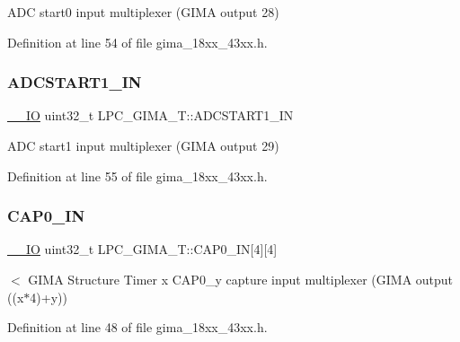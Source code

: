 A\+DC start0 input multiplexer (G\+I\+MA output 28) 

Definition at line 54 of file gima\+\_\+18xx\+\_\+43xx.\+h.

\mbox{\label{struct_l_p_c___g_i_m_a___t_ac21005da6bebbc5e17ff4bc950eb8784}} 
\subsubsection{\texorpdfstring{A\+D\+C\+S\+T\+A\+R\+T1\+\_\+\+IN}{ADCSTART1\_IN}}
{\footnotesize\ttfamily \hyperlink{core__sc300_8h_aec43007d9998a0a0e01faede4133d6be}{\+\_\+\+\_\+\+IO} uint32\+\_\+t L\+P\+C\+\_\+\+G\+I\+M\+A\+\_\+\+T\+::\+A\+D\+C\+S\+T\+A\+R\+T1\+\_\+\+IN}

A\+DC start1 input multiplexer (G\+I\+MA output 29) 

Definition at line 55 of file gima\+\_\+18xx\+\_\+43xx.\+h.

\mbox{\label{struct_l_p_c___g_i_m_a___t_a3f073838210e08cff5480aaeac1a3ccd}} 
\subsubsection{\texorpdfstring{C\+A\+P0\+\_\+\+IN}{CAP0\_IN}}
{\footnotesize\ttfamily \hyperlink{core__sc300_8h_aec43007d9998a0a0e01faede4133d6be}{\+\_\+\+\_\+\+IO} uint32\+\_\+t L\+P\+C\+\_\+\+G\+I\+M\+A\+\_\+\+T\+::\+C\+A\+P0\+\_\+\+IN\mbox{[}4\mbox{]}\mbox{[}4\mbox{]}}

$<$ G\+I\+MA Structure Timer x C\+A\+P0\+\_\+y capture input multiplexer (G\+I\+MA output ((x$\ast$4)+y)) 

Definition at line 48 of file gima\+\_\+18xx\+\_\+43xx.\+h.

\mbox{\label{struct_l_p_c___g_i_m_a___t_a78c314980deaf0c1a4d3230e3e93c8e0}} 
